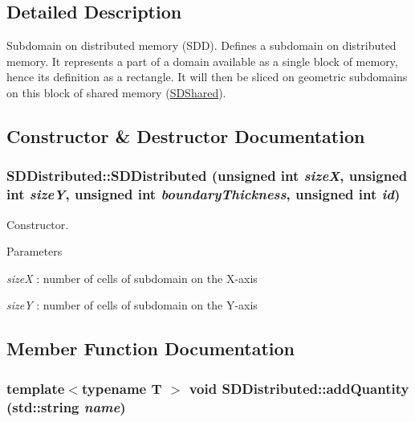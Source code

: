 \subsection{Detailed Description}
Subdomain on distributed memory (SDD). Defines a subdomain on distributed memory. It represents a part of a domain available as a single block of memory, hence its definition as a rectangle. It will then be sliced on geometric subdomains on this block of shared memory (\hyperlink{classSDShared}{SDShared}). 

\subsection{Constructor \& Destructor Documentation}
\hypertarget{classSDDistributed_a49ef3cd6d1409cc71d3800fd0fca2f28}{
\subsubsection[{SDDistributed}]{\setlength{\rightskip}{0pt plus 5cm}SDDistributed::SDDistributed (unsigned int {\em sizeX}, \/  unsigned int {\em sizeY}, \/  unsigned int {\em boundaryThickness}, \/  unsigned int {\em id})}}
\label{classSDDistributed_a49ef3cd6d1409cc71d3800fd0fca2f28}


Constructor. 
\begin{DoxyParams}{Parameters}
\item[{\em sizeX}]: number of cells of subdomain on the X-\/axis \item[{\em sizeY}]: number of cells of subdomain on the Y-\/axis \end{DoxyParams}


\subsection{Member Function Documentation}
\hypertarget{classSDDistributed_a6b21ad5588e9128737406ac417127393}{
\subsubsection[{addQuantity}]{\setlength{\rightskip}{0pt plus 5cm}template$<$typename T $>$ void SDDistributed::addQuantity (std::string {\em name})}}
\label{classSDDistributed_a6b21ad5588e9128737406ac417127393}


